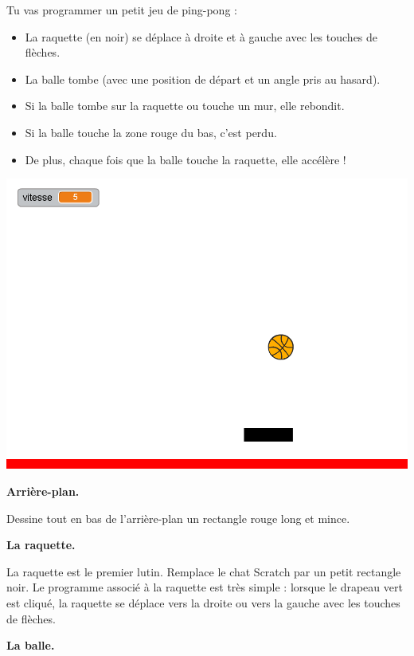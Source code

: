 \documentclass[class=report,crop=false, 12pt]{standalone}
\begin{document}
\begin{activite}

Tu vas programmer un petit jeu de ping-pong :
\begin{itemize}
  \item La raquette (en noir) se déplace à droite et à gauche avec les touches de flèches.
  \item La balle tombe (avec une position de départ et un angle pris au hasard).
  \item Si la balle tombe sur la raquette ou touche un mur, elle rebondit.
  \item Si la balle touche la zone rouge du bas, c'est perdu.
  \item De plus, chaque fois que la balle touche la raquette, elle accélère !
\end{itemize}

\begin{center}
  \includegraphics[scale=\scaleecran,scale=0.9]{ecran-06-ex3} 
\end{center}

\bigskip
\textbf{Arrière-plan.}

Dessine tout en bas de l'arrière-plan un rectangle rouge long et mince.

\bigskip
\textbf{La raquette.}

La raquette est le premier lutin. Remplace le chat Scratch par un petit rectangle noir.
Le programme associé à la raquette est très simple : lorsque le drapeau vert est cliqué, 
la raquette se déplace vers la droite ou vers la gauche avec les touches de flèches.

\bigskip
\textbf{La balle.}


\end{activite}
\end{document}
